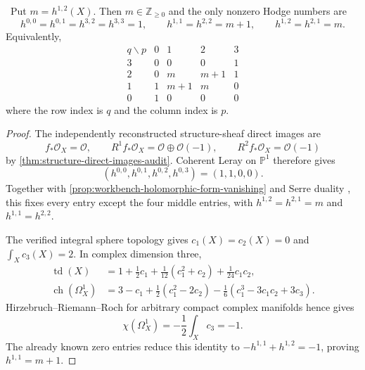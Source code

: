 \begin{theorem}
\label{thm:parametric-hodge-diamond}
\Verified\ Put $m=h^{1,2}(X)$.  Then $m\in\mathbb Z_{\ge0}$ and the
only nonzero Hodge numbers are
\[
 h^{0,0}=h^{0,1}=h^{3,2}=h^{3,3}=1,
 \qquad
 h^{1,1}=h^{2,2}=m+1,
 \qquad
 h^{1,2}=h^{2,1}=m.
\]
Equivalently,
\[
\begin{array}{c|cccc}
q\backslash p&0&1&2&3\\ \hline
3&0&0&0&1\\
2&0&m&m+1&1\\
1&1&m+1&m&0\\
0&1&0&0&0
\end{array}
\]
where the row index is $q$ and the column index is $p$.
\end{theorem}

\begin{proof}
The independently reconstructed structure-sheaf direct images are
\[
 f_*\mathcal O_X=\mathcal O,
 \qquad R^1f_*\mathcal O_X=\mathcal O\oplus\mathcal O(-1),
 \qquad R^2f_*\mathcal O_X=\mathcal O(-1)
\]
by \cref{thm:structure-direct-images-audit}.  Coherent Leray on
$\mathbb P^1$ therefore gives
\[
 (h^{0,0},h^{0,1},h^{0,2},h^{0,3})=(1,1,0,0).
\]
Together with \cref{prop:workbench-holomorphic-form-vanishing} and Serre
duality \cite[\S13, Theorem~4, p.~22]{Serre1955Duality}, this fixes every
entry except the four middle entries, with
$h^{1,2}=h^{2,1}=m$ and $h^{1,1}=h^{2,2}$.

The verified integral sphere topology gives $c_1(X)=c_2(X)=0$ and
$\int_Xc_3(X)=2$.  In complex dimension three,
\begin{align*}
 \operatorname{td}(X)
 &=1+\frac12c_1+\frac1{12}(c_1^2+c_2)+\frac1{24}c_1c_2,\\
 \operatorname{ch}(\Omega_X^1)
 &=3-c_1+\frac12(c_1^2-2c_2)
   -\frac16(c_1^3-3c_1c_2+3c_3).
\end{align*}
Hirzebruch--Riemann--Roch for arbitrary compact complex manifolds
\cite[Theorem~3, p.~427]{AtiyahSinger1963} hence gives
\[
 \chi(\Omega_X^1)=-\frac12\int_Xc_3=-1.
\]
The already known zero entries reduce this identity to
$-h^{1,1}+h^{1,2}=-1$, proving $h^{1,1}=m+1$.
\end{proof}
